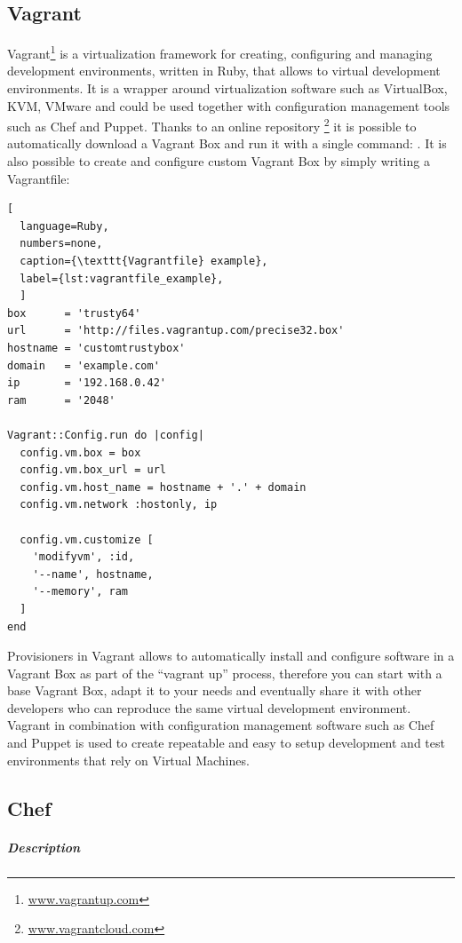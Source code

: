 \subsection{Vagrant}
\label{sub:sota_vagrant}
Vagrant\footnote{\url{www.vagrantup.com}} is a virtualization framework for creating, configuring and managing development environments, written in Ruby, that allows to  virtual development environments. It is a wrapper around virtualization software such as VirtualBox, KVM, VMware and could be used together with configuration management tools such as Chef and Puppet.
Thanks to an online repository \footnote{\url{www.vagrantcloud.com}} it is possible to automatically download a Vagrant Box and run it with a single command: .
It is also possible to create and configure custom Vagrant Box by simply writing a Vagrantfile:
\begin{lstlisting}[
  language=Ruby,
  numbers=none,
  caption={\texttt{Vagrantfile} example},
  label={lst:vagrantfile_example},
  ]
box      = 'trusty64'
url      = 'http://files.vagrantup.com/precise32.box'
hostname = 'customtrustybox'
domain   = 'example.com'
ip       = '192.168.0.42'
ram      = '2048'

Vagrant::Config.run do |config|
  config.vm.box = box
  config.vm.box_url = url
  config.vm.host_name = hostname + '.' + domain
  config.vm.network :hostonly, ip

  config.vm.customize [
    'modifyvm', :id,
    '--name', hostname,
    '--memory', ram
  ]
end
\end{lstlisting}
Provisioners in Vagrant allows to automatically install and configure software in a Vagrant Box as part of the ``vagrant up'' process, therefore you can start with a base Vagrant Box, adapt it to your needs and eventually share it with other developers who can reproduce the same virtual development environment.
Vagrant in combination with configuration management software such as Chef and Puppet is used to create repeatable and easy to setup development and test environments that rely on Virtual Machines.



\subsection{Chef}
\label{sub:sota_chef}

\subparagraph{Description}
\label{subp:sota_chef_desc}

